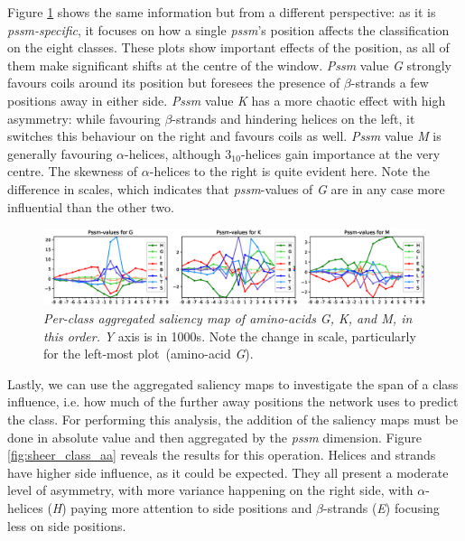 Figure \ref{fig:class_agg_aa} shows the same information but from a different perspective: as it is \textit{pssm-specific}, it focuses on how a single \textit{pssm}'s position affects the classification on the eight classes. These plots show important effects of the position, as all of them make significant shifts at the centre of the window. \textit{Pssm} value \textit{G} strongly favours coils around its position but foresees the presence of $\beta$-strands a few positions away in either side. \textit{Pssm} value \textit{K} has a more chaotic effect with high asymmetry: while favouring $\beta$-strands and hindering helices on the left, it switches this behaviour on the right and favours coils as well. \textit{Pssm} value \textit{M} is generally favouring $\alpha$-helices, although $3_{10}$-helices gain importance at the very centre. The skewness of $\alpha$-helices to the right is quite evident here. Note the difference in scales, which indicates that \textit{pssm}-values of \textit{G} are in any case more influential than the other two.

\begin{figure}
	\centering
	\includegraphics[width=1\linewidth]{Figures/class_agg_aa}
	\caption{\textit{Per-class aggregated saliency map of amino-acids G, K, and M, in this order.} \textit{Y} axis is in 1000s. Note the change in scale, particularly for the left-most plot~(amino-acid \textit{G}).}
	\label{fig:class_agg_aa}
\end{figure}

Lastly, we can use the aggregated saliency maps to investigate the span of a class influence, i.e. how much of the further away positions the network uses to predict the class. For performing this analysis, the addition of the saliency maps must be done in absolute value and then aggregated by the \textit{pssm} dimension. Figure \ref{fig:sheer_class_aa} reveals the results for this operation. Helices and strands have higher side influence, as it could be expected. They all present a moderate level of asymmetry, with more variance happening on the right side, with $\alpha$-helices (\textit{H}) paying more attention to side positions and $\beta$-strands (\textit{E}) focusing less on side positions.

